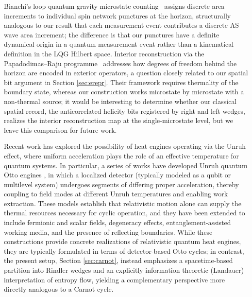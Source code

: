 \documentclass[12pt,a4paper]{article}
\begin{document}
Bianchi's 
loop quantum gravity microstate counting~\cite{bianchi2012} 
assigns discrete area increments to individual spin network punctures 
at the horizon, structurally analogous to our result that each 
measurement event contributes a discrete AS-wave area increment; 
the difference is that our punctures have a definite dynamical 
origin in a quantum measurement event rather than a kinematical 
definition in the LQG Hilbert space. Interior reconstruction via the Papadodimas--Raju 
programme~\cite{papadodimas2013} %
addresses how degrees of freedom behind the horizon are encoded in 
exterior operators, a question closely related to our spatial bit 
argument in Section \ref{sec:erepr}. Their framework requires thermality of the boundary state, 
whereas our construction works microstate by microstate with a 
non-thermal source; it would be interesting to determine whether 
our classical spatial record, the anticorrelated helicity bits 
registered by right and left wedges, realizes the interior 
reconstruction map at the single-microstate level, but we leave 
this comparison for future work.

Recent work has explored the possibility of heat engines operating via the Unruh effect, where uniform acceleration plays the role of an effective temperature for quantum systems. In particular, a series of works have developed Unruh quantum Otto engines \cite{arias2018unruh}, in which a localized detector (typically modeled as a qubit or multilevel system) undergoes segments of differing proper acceleration, thereby coupling to field modes at different Unruh temperatures and enabling work extraction. These models establish that relativistic motion alone can supply the thermal resources necessary for cyclic operation, and they have been extended to include fermionic and scalar fields, degeneracy effects, entanglement-assisted working media, and the presence of reflecting boundaries. While these constructions provide concrete realizations of relativistic quantum heat engines, they are typically formulated in terms of detector-based Otto cycles; in contrast, the present setup, Section \ref{sec:carnot}, instead emphasizes a spacetime-based partition into Rindler wedges and an explicitly information-theoretic (Landauer) interpretation of entropy flow, yielding a complementary perspective more directly analogous to a Carnot cycle.
\end{document}
